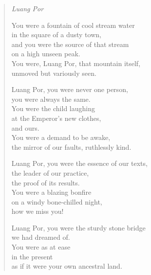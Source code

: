 
\cleartoverso
\markboth{}{}

\thispagestyle{empty}

\begin{verse}
\emph{Luang Por}

You were a fountain of cool stream water\\
in the square of a dusty town,\\
and you were the source of that stream\\
on a high unseen peak.\\
You were, Luang Por, that mountain itself,\\
unmoved but variously seen.

Luang Por, you were never one person,\\
you were always the same.\\
You were the child laughing\\
at the Emperor's new clothes,\\
and ours.\\
You were a demand to be awake,\\
the mirror of our faults, ruthlessly kind.

Luang Por, you were the essence of our texts,\\
the leader of our practice,\\
the proof of its results.\\
You were a blazing bonfire\\
on a windy bone-chilled night,\\
how we miss you!

Luang Por, you were the sturdy stone bridge\\
we had dreamed of.\\
You were as at ease\\
in the present\\
as if it were your own ancestral land.

\end{verse}

\clearpage
\thispagestyle{empty}

